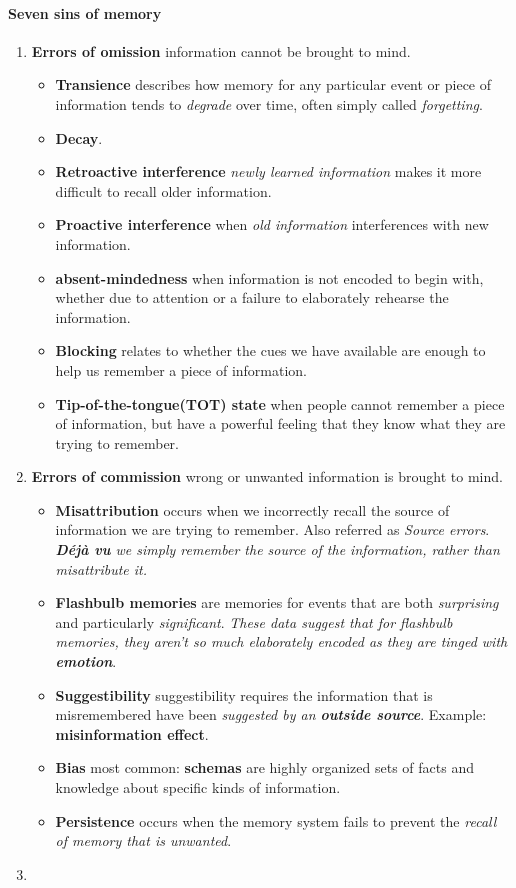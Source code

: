 \documentclass{article}
\begin{document}
	\paragraph{Seven sins of memory}
	\begin{enumerate}
		\item \textbf{Errors of omission} information cannot be brought to mind.
			\begin{itemize}
				\item \textbf{Transience} describes how memory for any particular event or piece of information tends to \emph{degrade} over time, often simply called \emph{forgetting}.
				\item \textbf{Decay}.
				\item \textbf{Retroactive interference} \emph{newly learned information} makes it more difficult to recall older information.
				\item \textbf{Proactive interference} when \emph{old information} interferences with new information.
				\item \textbf{absent-mindedness} when information is not encoded to begin with, whether due to attention or a failure to elaborately rehearse the information.
				\item \textbf{Blocking} relates to whether the cues we have available are enough to help us remember a piece of information.
				\item \textbf{Tip-of-the-tongue(TOT) state} when people cannot remember a piece of information, but have a powerful feeling that they know what they are trying to remember.
			\end{itemize}
		\item \textbf{Errors of commission} wrong or unwanted information is brought to mind. 
			\begin{itemize}
				\item \textbf{Misattribution} occurs when we incorrectly recall the source of information we are trying to remember. Also referred as \emph{Source errors}.
					\emph{\textbf{Déjà vu} we simply  remember the source of the information, rather than misattribute it.}
				\item \textbf{Flashbulb memories} are memories for events that are both \emph{surprising} and particularly \emph{significant}. \emph{These data suggest that for flashbulb memories, they aren't so much elaborately encoded as they are tinged with \textbf{emotion}}.
				\item \textbf{Suggestibility} suggestibility requires the information that is misremembered have been \emph{suggested by an \textbf{outside source}}. Example: \textbf{misinformation effect}.
				\item \textbf{Bias} most common: \textbf{schemas} are highly organized sets of facts and knowledge about specific kinds of information.
				\item \textbf{Persistence} occurs when the memory system fails to prevent the \emph{recall of memory that is unwanted}.
			\end{itemize}
		\item 
	\end{enumerate}
\end{document}
